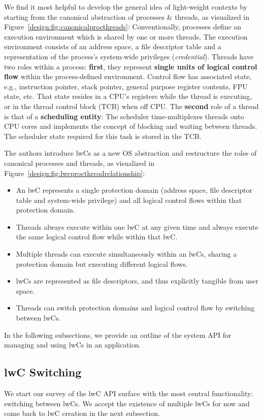 \documentclass[10pt,twocolumn,a4paper]{article}
\begin{document}
We find it most helpful to develop the general idea of light-weight contexts by starting from the canonical abstraction of processes \& threads, as visualized in Figure~\ref{design:fig:canonicalprocthreads}:
Conventionally, processes define an execution environment which is shared by one or more threads.
The execution environment consists of an address space, a file descriptor table and a representation of the process's system-wide privileges (\textit{credential}).
Threads have two roles within a process:
\textbf{first}, they represent \textbf{single units of logical control flow} within the process-defined environment.
Control flow has associated state, e.g., instruction pointer, stack pointer, general purpose register contents, FPU state, etc.
That state resides in a CPU's registers while the thread is executing, or in the thread control block (TCB) when off CPU.
The \textbf{second} role of a thread is that of a \textbf{scheduling entity}:
The scheduler time-multiplexes threads onto CPU cores and implements the concept of blocking and waiting between threads.
The scheduler state required for this task is stored in the TCB.

The authors introduce lwCs as a new OS abstraction and restructure the roles of canonical processes and threads, as visualized in Figure~\ref{design:fig:lwcprocthreadrelationship}:
\begin{itemize}
\item An lwC represents a single protection domain (address space, file descriptor table and system-wide privilege) and all logical control flows within that protection domain.
\item Threads always execute within one lwC at any given time and always execute the same logical control flow while within that lwC.
\item Multiple threads can execute simultaneously within an lwCs, sharing a protection domain but executing different logical flows.
\item lwCs are represented as file descriptors, and thus explicitly tangible from user space.
\item Threads can switch protection domains and logical control flow by switching between lwCs.
\end{itemize}
\cite{lwcpaper,lwckernelrepo}

In the following subsections, we provide an outline of the system API for managing and using lwCs in an application.

\subsection{lwC Switching}\label{design:switching}
We start our survey of the lwC API surface with the most central functionality: switching between lwCs.
We accept the existence of multiple lwCs for now and come back to lwC creation in the next subsection.
\end{document}
